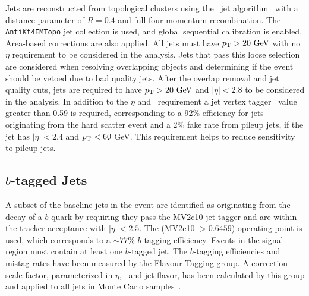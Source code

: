Jets are reconstructed from topological clusters using the \antikt\ jet algorithm~\cite{antikt} with a distance parameter of $R = 0.4$ and full four-momentum recombination. The {\tt AntiKt4EMTopo} jet collection is used, and global sequential calibration is enabled. Area-based corrections are also applied. %
All jets must have $\pT > 20\gev$ with no $\eta$ requirement to be considered in the analysis. Jets that pass this loose selection are considered when resolving overlapping objects and determining if the event should be vetoed due to bad quality jets.  After the overlap removal and jet quality cuts, jets are required to have $\pt > 20\gev$ and $|\eta|<2.8$ to be considered in the analysis. In addition to the $\eta$ and \pt\ requirement a jet vertex tagger~\cite{jvtTwiki} value greater than 0.59 is required, corresponding to a 92\% efficiency for jets originating from the hard scatter event and a 2\% fake rate from pileup jets, if the jet has $|\eta|<2.4$ and $p_{\mathrm{T}}<60$ GeV. This requirement helps to reduce sensitivity to pileup jets.



\subsection{\boldmath $b$-tagged Jets}

A subset of the baseline jets in the event are identified as originating from the decay of a $b$-quark by requiring they pass the MV2c10 jet tagger and are within the tracker acceptance with $|\eta| < 2.5$.  The (MV2c10 $> 0.6459$) operating point is used, which corresponds to a $\sim77\%$ $b$-tagging efficiency. %
Events in the signal region must contain at least one $b$-tagged jet.  The $b$-tagging efficiencies and mistag rates have been measured by the Flavour Tagging group.  A correction scale factor, parameterized in  $\eta$, \pT\, and jet flavor, has been calculated by this group and applied to all jets in Monte Carlo samples~\cite{BtaggingCalibrationToolwiki}. 


